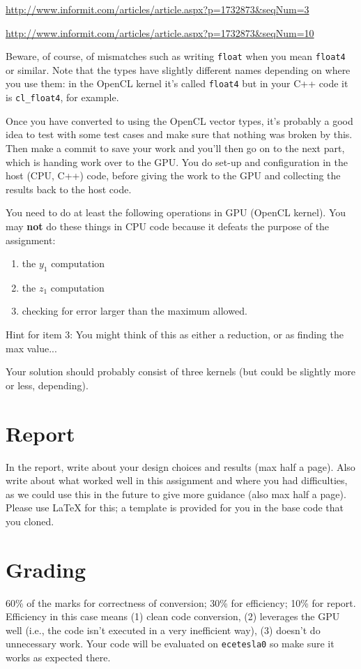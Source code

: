 \documentclass[letterpaper,10pt]{article}
\begin{document}
\begin{center}

\url{http://www.informit.com/articles/article.aspx?p=1732873&seqNum=3}

\url{http://www.informit.com/articles/article.aspx?p=1732873&seqNum=10}

\end{center}

Beware, of course, of mismatches such as writing \texttt{float} when you mean 
\texttt{float4} or similar. Note that the types have slightly different names 
depending on where you use them: in the OpenCL kernel it's called
\texttt{float4} but in your C++ code it is \texttt{cl\_float4}, for example. 

Once you have converted to using the OpenCL vector types, it's probably a good idea 
to test with some test cases and make sure that nothing was broken by this. Then make 
a commit to save your work and you'll then go on to the next part, which is handing 
work over to the GPU. You do set-up and configuration in the host (CPU, C++) code, before giving the work to the GPU and collecting the results back to the host code.

You need to do at least the following operations in GPU (OpenCL kernel). You may \textbf{ not } do these things in CPU code because it defeats the purpose of the assignment: 

\begin{enumerate}
\item the $y_{1}$ computation
\item the $z_{1}$ computation
\item checking for error larger than the maximum allowed.
\end{enumerate} 

Hint for item 3:  You might think of this as either a reduction, or as finding the max value...

Your solution should probably consist of three kernels (but could be slightly more or less, depending).

\section*{Report}
In the report, write about your design choices and results (max half a page). Also 
write about what worked well in this assignment and where you had difficulties, as
we could use this in the future to give more guidance (also max half a page). Please use LaTeX for this; a template is provided for you in the base code that you cloned. 

\section*{Grading}
60\% of the marks for correctness of conversion; 30\% for efficiency; 10\% for report. Efficiency in this case means (1) clean code conversion, (2) leverages the GPU well (i.e., the code isn't executed in a very inefficient way), (3) doesn't do unnecessary work. Your code will be evaluated on \texttt{ecetesla0} so make sure it
works as expected there. 
\end{document}
